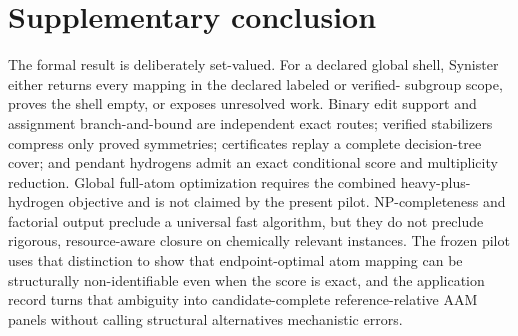 \documentclass[11pt]{article}
\theoremstyle{definition}
\begin{document}
\section{Supplementary conclusion}

The formal result is deliberately set-valued.  For a declared global shell,
Synister either returns every mapping in the declared labeled or verified-
subgroup scope, proves the shell empty, or exposes unresolved work.  Binary
edit support and assignment branch-and-bound are independent exact routes;
verified stabilizers compress only proved symmetries; certificates replay a
complete decision-tree cover; and pendant hydrogens admit an exact conditional
score and multiplicity reduction.  Global full-atom optimization requires the
combined heavy-plus-hydrogen objective and is not claimed by the present
pilot.  NP-completeness and factorial output
preclude a universal fast algorithm, but they do not preclude rigorous,
resource-aware closure on chemically relevant instances.  The frozen pilot
uses that distinction to show that endpoint-optimal atom mapping can be
structurally non-identifiable even when the score is exact, and the application
record turns that ambiguity into candidate-complete reference-relative AAM
panels without calling structural alternatives mechanistic errors.
\end{document}
